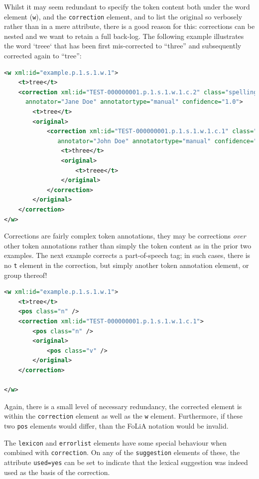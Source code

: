 \documentclass[a4paper,12pt]{report}
\begin{document}
Whilst it may seem redundant to specify the token content both under the word element (\texttt{w}), and the \texttt{correction} element, and to list the original so verbosely rather than in a mere attribute, there is a good reason for this: corrections can be nested and we want to retain a full back-log. The following example illustrates the word `treee` that has been first mis-corrected to ``three'' and subsequently corrected again to ``tree'':

\begin{lstlisting}[language=xml]
<w xml:id="example.p.1.s.1.w.1">
    <t>tree</t>
    <correction xml:id="TEST-000000001.p.1.s.1.w.1.c.2" class="spelling" 
      annotator="Jane Doe" annotatortype="manual" confidence="1.0">
        <t>tree</t>
        <original>
            <correction xml:id="TEST-000000001.p.1.s.1.w.1.c.1" class="spelling"
               annotator="John Doe" annotatortype="manual" confidence="0.6">
                <t>three</t>
                <original>
                    <t>treee</t>
                </original>
            </correction>
        </original>
    </correction>
</w>
\end{lstlisting}

Corrections are fairly complex token annotations, they may be corrections \emph{over} other token annotations rather than simply the token content as in the prior two examples. The next example corrects a part-of-speech tag; in such cases, there is no \texttt{t} element in the correction, but simply another token annotation element, or group thereof!

\begin{lstlisting}[language=xml]
<w xml:id="example.p.1.s.1.w.1">
    <t>tree</t>
    <pos class="n" />
    <correction xml:id="TEST-000000001.p.1.s.1.w.1.c.1">
        <pos class="n" />
        <original>
            <pos class="v" />
        </original>
    </correction>
    
</w>    
\end{lstlisting}

Again, there is a small level of necessary redundancy, the corrected element is within the \texttt{correction} element as well as the \texttt{w} element. Furthermore, if these two \texttt{pos} elements would differ, than the FoLiA notation would be invalid.

The \texttt{lexicon} and \texttt{errorlist} elements have some special behaviour when combined with \texttt{correction}. On any of the \texttt{suggestion} elements of these, the attribute \texttt{used=yes} can be set to indicate that the lexical suggestion was indeed used as the basis of the correction.
\end{document}
